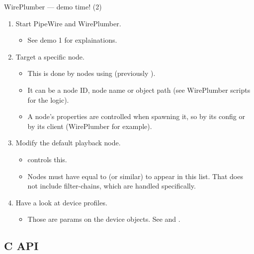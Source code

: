 \begin{frame}{WirePlumber — demo time! (2)}
  \begin{enumerate}

  \item Start PipeWire and WirePlumber.

    \begin{itemize}
    \item See demo 1 for explainations.
    \end{itemize}

  \item Target a specific node.

    \begin{itemize}
    \item This is done by nodes using  (previously
      ).
    \item It can be a node ID, node name or object path (see
      WirePlumber scripts for the logic).
    \item A node's properties are controlled when spawning it, so by
      its config or by its client (WirePlumber for example).
    \end{itemize}

  \item Modify the default playback node.

    \begin{itemize}
    \item {} controls this.
    \item Nodes must have  equal to 
      (or similar) to appear in this list. That does not include filter-chains,
      which are handled specifically.
    \end{itemize}

  \item Have a look at device profiles.

    \begin{itemize}
    \item Those are params on the device objects. See 
      and .
    \end{itemize}

  \end{enumerate}
\end{frame}



\subsection{C API}



